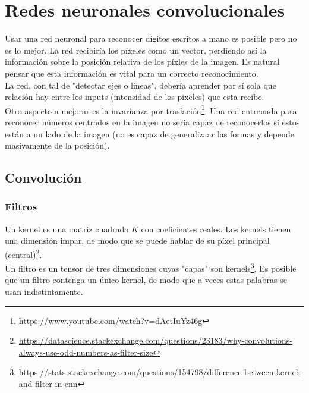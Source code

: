 \documentclass{article}
\begin{document}
\section{Redes neuronales convolucionales}

Usar una red neuronal para reconocer dígitos escritos a mano es posible pero no es lo mejor. La red recibiría los píxeles como un vector, perdiendo así la información sobre la posición relativa de los píxles de la imagen. Es natural pensar que esta información es vital para un correcto reconocimiento.\\

La red, con tal de "detectar ejes o lineas", debería aprender por sí sola que relación hay entre los inputs (intensidad de los pixeles) que esta recibe.\\

Otro aspecto a mejorar es la invarianza por traslación\footnote{\url{https://www.youtube.com/watch?v=dAetIuYz46g}}. Una red entrenada para reconocer números centrados en la imagen no sería capaz de reconocerlos si estos están a un lado de la imagen (no es capaz de generalizaar las formas y depende masivamente de la posición).

\subsection{Convolución}

\subsubsection{Filtros}
Un kernel es una matriz cuadrada $K$ con coeficientes reales. Los kernels tienen una dimensión impar, de modo que se puede hablar de su píxel principal (central)\footnote{\url{https://datascience.stackexchange.com/questions/23183/why-convolutions-always-use-odd-numbers-as-filter-size}}.\\

Un filtro es un tensor de tres dimensiones cuyas "capas" son kernels\footnote{\url{https://stats.stackexchange.com/questions/154798/difference-between-kernel-and-filter-in-cnn}}. Es posible que un filtro contenga un único kernel, de modo que a veces  estas palabras se usan indistintamente.\\
\end{document}
